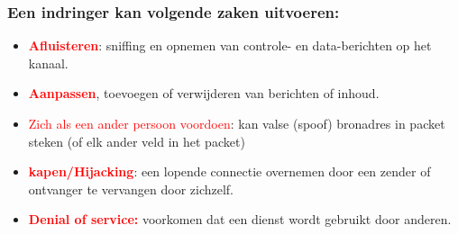 \subsubsection{Een indringer kan volgende zaken uitvoeren:}

\begin{itemize}
    \item \textcolor{red}{\textbf{Afluisteren}}: sniffing en opnemen van controle- en data-berichten op het kanaal.
    \item \textcolor{red}{\textbf{Aanpassen}}, toevoegen of verwijderen van berichten of inhoud. 
    \item \textcolor{red}{Zich als een ander persoon voordoen}: kan valse (spoof) bronadres in packet steken (of elk ander veld in het packet)
    \item \textcolor{red}{\textbf{kapen/Hijacking}}: een lopende connectie overnemen door een zender of ontvanger te vervangen door zichzelf.
    \item \textcolor{red}{\textbf{Denial of service:}} voorkomen dat een dienst wordt gebruikt door anderen.
\end{itemize}